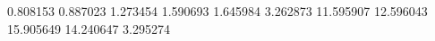 0.808153
0.887023
1.273454
1.590693
1.645984
3.262873
11.595907
12.596043
15.905649
14.240647
3.295274
